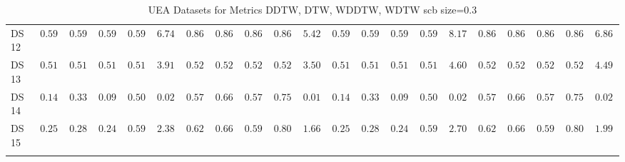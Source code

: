 {\begin{longtable}{|l|ccccc|ccccc|ccccc|ccccc|}
		DS 12 & $0.5957$ & $0.5955$ & $0.5954$ & $0.5955$ & $6.7450$ & $0.8652$ & $0.8638$ & $0.8646$ & $0.8638$ & $\boldsymbol{5.4204}$ & $0.5957$ & $0.5955$ & $0.5954$ & $0.5955$ & $8.1749$ & $\boldsymbol{0.8652}$ & $\boldsymbol{0.8638}$ & $\boldsymbol{0.8646}$ & $\boldsymbol{0.8638}$ & $6.8655$ \\
		DS 13 & $0.5158$ & $0.5154$ & $0.5144$ & $0.5154$ & $3.9178$ & $0.5263$ & $0.5271$ & $0.5255$ & $0.5271$ & $\boldsymbol{3.5093}$ & $0.5158$ & $0.5154$ & $0.5144$ & $0.5154$ & $4.6074$ & $\boldsymbol{0.5263}$ & $0.5271$ & $0.5255$ & $0.5271$ & $4.4960$ \\
		DS 14 & $0.1429$ & $0.3333$ & $0.0952$ & $0.5000$ & $0.0200$ & $0.5714$ & $0.6667$ & $0.5794$ & $0.7500$ & $\boldsymbol{0.0187}$ & $0.1429$ & $0.3333$ & $0.0952$ & $0.5000$ & $0.0266$ & $\boldsymbol{0.5714}$ & $\boldsymbol{0.6667}$ & $\boldsymbol{0.5794}$ & $\boldsymbol{0.7500}$ & $0.0249$ \\
		DS 15 & $0.2545$ & $0.2881$ & $0.2499$ & $0.5932$ & $2.3844$ & $0.6273$ & $0.6635$ & $0.5951$ & $0.8077$ & $\boldsymbol{1.6627}$ & $0.2545$ & $0.2881$ & $0.2499$ & $0.5932$ & $2.7035$ & $0.6273$ & $0.6635$ & $0.5951$ & $0.8077$ & $1.9924$ \\
		\hline
		\caption{UEA Datasets for Metrics DDTW, DTW, WDDTW, WDTW \gls{scb} size=0.3}
		\label{tab:UEA_ddtw-dtw-wddtw-wdtw_scb_size=0.3}
	\end{longtable}
}
